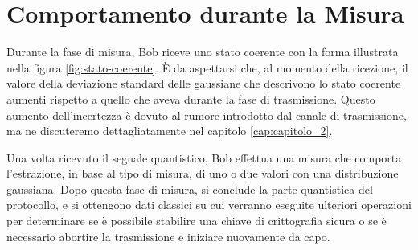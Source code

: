 \section{Comportamento durante la Misura}

Durante la fase di misura, Bob riceve uno stato coerente con la forma illustrata nella figura \ref{fig:stato-coerente}. È da aspettarsi che, al momento della ricezione, il valore della deviazione standard delle gaussiane che descrivono lo stato coerente aumenti rispetto a quello che aveva durante la fase di trasmissione. Questo aumento dell'incertezza è dovuto al rumore introdotto dal canale di trasmissione, ma ne discuteremo dettagliatamente nel capitolo \ref{cap:capitolo_2}.

Una volta ricevuto il segnale quantistico, Bob effettua una misura che comporta l'estrazione, in base al tipo di misura, di uno o due valori con una distribuzione gaussiana. Dopo questa fase di misura, si conclude la parte quantistica del protocollo, e si ottengono dati classici su cui verranno eseguite ulteriori operazioni per determinare se è possibile stabilire una chiave di crittografia sicura o se è necessario abortire la trasmissione e iniziare nuovamente da capo.